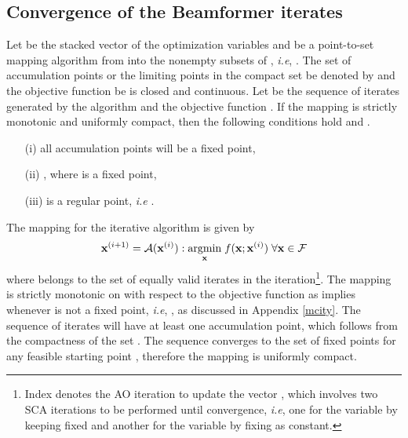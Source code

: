 \subsection{Convergence of the Beamformer iterates}
Let \me{\mbf{\ma} \triangleq [\mx,\my,\mz]} be the stacked vector of the optimization variables and  be a point-to-set mapping algorithm from  into the nonempty subsets of , \textit{i.e}, . The set of accumulation points or the limiting points in the compact set  be denoted by  and the objective function be  is closed and continuous. Let  be the sequence of iterates generated by the algorithm  and the objective function . If the mapping is strictly monotonic and uniformly compact, then the following conditions hold \cite{zangwill1969nonlinear} and \cite[Theorem 3.1]{meyer1976sufficient}.
\begin{itemize}
\item[(i)] all accumulation points will be a fixed point,
\item[(ii)] , where \eqn{\ma^\ast} is a fixed point,
\item[(iii)] \eqn{\ma^\ast} is a regular point, \textit{i.e} .
\end{itemize}

The mapping  for the iterative algorithm is given by
\begin{equation}
{\mathbf{x}}^{(i+1)} = \mathcal{A}({\mathbf{x}}^{(i)}) : \underset{\mathbf{x}}{\mathrm{argmin}} \; f(\mathbf{x};{\mathbf{x}}^{(i)}) \; \forall \mathbf{x} \in \mathcal{F}
\end{equation}
where  belongs to the set of equally valid iterates  in the  iteration\footnote{Index  denotes the \ac{AO} iteration to update the vector \me{\ma}, which involves two \ac{SCA} iterations to be performed until convergence, \textit{i.e}, one for the variable \me{\mx} by keeping \me{\my} fixed and another for the variable \me{\my} by fixing \me{\mx} as constant.}. The mapping is strictly monotonic on  with respect to the objective function as  implies  whenever \me{\ma} is not a fixed point, \textit{i.e}, , as discussed in Appendix \ref{mcity}. The sequence of iterates  will have at least one accumulation point, which follows from the compactness of the set \cite{zangwill1969nonlinear}. The sequence  converges to the set of fixed points  for any feasible starting point , therefore the mapping is uniformly compact.

